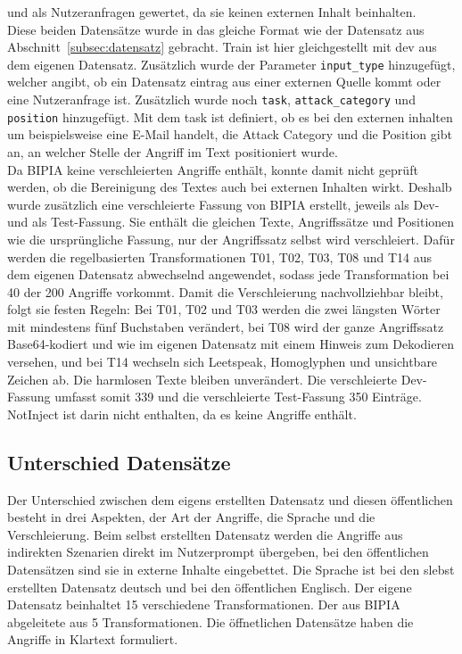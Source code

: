 und als Nutzeranfragen gewertet, da sie keinen externen Inhalt beinhalten. \\
Diese beiden Datensätze wurde in das gleiche Format wie der Datensatz aus Abschnitt~\ref{subsec:datensatz} gebracht. Train
ist hier gleichgestellt mit dev aus dem eigenen Datensatz. Zusätzlich wurde der Parameter \texttt{input\_type} hinzugefügt, welcher angibt, ob ein Datensatz eintrag aus einer
externen Quelle kommt oder eine Nutzeranfrage ist. Zusätzlich wurde noch \texttt{task}, \texttt{attack\_category} und \texttt{position} hinzugefügt. Mit dem task ist definiert, ob es bei den 
externen inhalten um beispielsweise eine E-Mail handelt, die Attack Category und die Position gibt an, an welcher Stelle der Angriff im Text positioniert 
wurde. \\
Da BIPIA keine verschleierten Angriffe enthält, konnte damit nicht geprüft werden, ob die Bereinigung des Textes auch bei externen Inhalten wirkt. Deshalb wurde
zusätzlich eine verschleierte Fassung von BIPIA erstellt, jeweils als Dev- und als Test-Fassung. Sie enthält die gleichen Texte, Angriffssätze und Positionen wie die
ursprüngliche Fassung, nur der Angriffssatz selbst wird verschleiert. Dafür werden die regelbasierten Transformationen T01, T02, T03, T08 und T14 aus dem eigenen
Datensatz abwechselnd angewendet, sodass jede Transformation bei 40 der 200 Angriffe vorkommt. Damit die Verschleierung nachvollziehbar bleibt, folgt sie festen Regeln:
Bei T01, T02 und T03 werden die zwei längsten Wörter mit mindestens fünf Buchstaben verändert, bei T08 wird der ganze Angriffssatz Base64-kodiert und wie im eigenen
Datensatz mit einem Hinweis zum Dekodieren versehen, und bei T14 wechseln sich Leetspeak, Homoglyphen und unsichtbare Zeichen ab. Die harmlosen Texte bleiben unverändert.
Die verschleierte Dev-Fassung umfasst somit 339 und die verschleierte Test-Fassung 350 Einträge. NotInject ist darin nicht enthalten, da es keine Angriffe enthält.

\subsection{Unterschied Datensätze}

Der Unterschied zwischen dem eigens erstellten Datensatz und diesen öffentlichen besteht in drei Aspekten, der Art der Angriffe, die Sprache und die 
Verschleierung. Beim selbst erstellten Datensatz werden die Angriffe aus indirekten Szenarien direkt im Nutzerprompt übergeben, bei den öffentlichen Datensätzen 
sind sie in externe Inhalte eingebettet. Die Sprache ist bei den slebst erstellten Datensatz deutsch und bei den öffentlichen Englisch. Der eigene Datensatz beinhaltet
15 verschiedene Transformationen. Der aus BIPIA abgeleitete aus 5 Transformationen. Die öffnetlichen Datensätze haben die Angriffe in Klartext formuliert.

